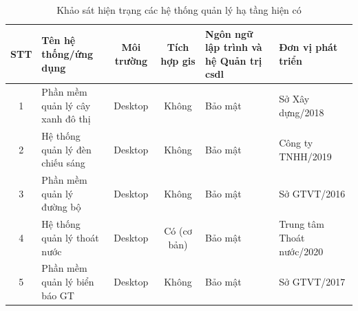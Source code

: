 \begin{table}[htpb]
    \centering
    \caption{Khảo sát hiện trạng các hệ thống quản lý hạ tầng hiện có}
    \label{tab:hien_trang_he_thong}
    \renewcommand{\arraystretch}{1.5} %
    \begin{tabular}{|c|p{3.5cm}|c|c|p{2.5cm}|p{2.4cm}|}
        \hline
        \textbf{STT} & 
        \centering\textbf{Tên hệ thống/ứng dụng} & 
        \textbf{Môi trường} & 
        \textbf{Tích hợp \gls{gis}} & 
        \centering\textbf{Ngôn ngữ lập trình và hệ Quản trị \gls{csdl}} & 
        \centering\arraybackslash\textbf{Đơn vị phát triển} \\ \hline
        
        1 & Phần mềm quản lý cây xanh đô thị & Desktop & Không & Bảo mật & Sở Xây dựng/2018 \\ \hline
        2 & Hệ thống quản lý đèn chiếu sáng & Desktop & Không & Bảo mật & Công ty TNHH/2019 \\ \hline
        3 & Phần mềm quản lý đường bộ & Desktop & Không & Bảo mật & Sở GTVT/2016 \\ \hline
        4 & Hệ thống quản lý thoát nước & Desktop & Có (cơ bản) & Bảo mật & Trung tâm Thoát nước/2020 \\ \hline
        5 & Phần mềm quản lý biển báo GT & Desktop & Không & Bảo mật & Sở GTVT/2017 \\ \hline
    \end{tabular}
\end{table}